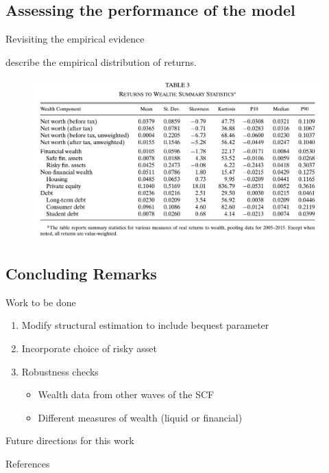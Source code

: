 \documentclass{beamer}
\begin{document}

\subsection{Assessing the performance of the model}

\begin{frame}{Revisiting the empirical evidence}

\cite{aflgdmlp20} describe the empirical distribution of returns.

  \vfill
   \begin{figure}
    \centering
    \includegraphics[width=.75\linewidth]{Figures/Fagereng2020Table3.png}
  \end{figure}
  \vfill

\end{frame}

\subsection{Concluding Remarks}

\begin{frame}{Work to be done}
       
       \begin{enumerate}
       \item Modify structural estimation to include bequest parameter
       \item Incorporate choice of risky asset
       \item Robustness checks
       \begin{itemize}
      \item Wealth data from other waves of the SCF
      \item Different measures of wealth (liquid or financial)
      \end{itemize}
      \end{enumerate}
  
\end{frame}

\begin{frame}{Future directions for this work}
\end{frame}


\begin{frame}[allowframebreaks]{References}
  \printbibliography
\end{frame}
\end{document}
